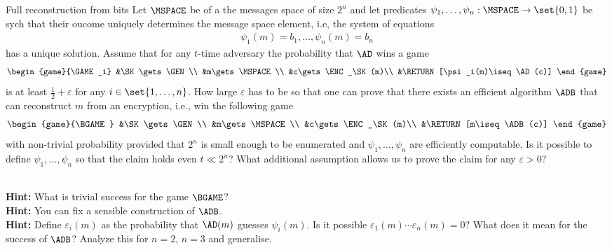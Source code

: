 \documentclass{crypto-exercise}
\author{Sven Laur}
\begin{document}
\begin{exercise}{Full reconstruction from bits}
Let  $\MSPACE$ be of a the messages space of size $2^n$ and let predicates $\psi_1,\ldots,\psi_n:\MSPACE\to\set{0,1}$ be  sych that their oucome uniquely determines the message space element, i.e, the system of equations
\begin{align*}
\psi_1(m)=b_1,\ldots,\psi_n(m)=b_n
\end{align*}
has a unique solution. Assume that for any $t$-time adversary the probability that $\AD$ wins a game 
\begin{align*}
  \begin{game}{\GAME_i}
    &\SK\gets\GEN\\
    &m\gets\MSPACE\\
    &c\gets\ENC_\SK(m)\\
    &\RETURN [\psi_i(m)\iseq \AD(c)]
  \end{game}
\end{align*}
is at least $\frac{1}{2}+\varepsilon$ for any $i\in\set{1,\ldots,n}$.  How large $\varepsilon$ has to be so that one can  prove that there exists an efficient algorithm $\ADB$ that can reconstruct $m$ from an encryption, i.e., win the following game 
\begin{align*}
  \begin{game}{\BGAME}
    &\SK\gets\GEN\\
    &m\gets\MSPACE\\
    &c\gets\ENC_\SK(m)\\
    &\RETURN [m\iseq \ADB(c)]
  \end{game}
\end{align*}
with non-trivial probability provided that $2^n$ is small enough to be enumerated and $\psi_1,\ldots,\psi_n$ are efficiently computable.  Is it possible to define  $\psi_1,\ldots,\psi_n$ so that the claim holds even $t\ll2^n$? What additional assumption allows us to prove the claim for any $\varepsilon >0$?
\end{exercise}
\begin{solution}\ \\
\textbf{Hint:} What is trivial success for the game $\BGAME$?\\
\textbf{Hint:} You can fix a sensible construction of $\ADB$.\\
\textbf{Hint:} Define $\varepsilon_i(m)$ as the probability that $\AD(m)$ guesses $\psi_i(m)$. Is it possible $\varepsilon_1(m)\cdots\varepsilon_n(m)=0$? What does it mean for the success of $\ADB$? Analyze this for $n=2$, $n=3$ and generalise. 
 
\end{solution}
\end{document}
